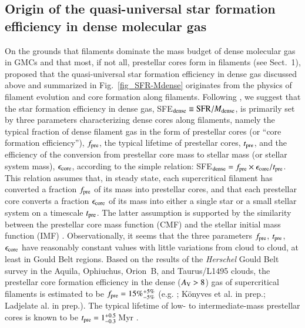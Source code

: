 \documentclass{aa}
\begin{document}
{{\subsection{Origin of the quasi-universal star formation efficiency in dense molecular gas}\label{Sect:origin}

On the grounds that filaments dominate the mass budget of dense molecular gas in GMCs and that most, if not all, prestellar cores form in filaments (see Sect.~1), 
\citet{Andre14} proposed that the quasi-universal star formation efficiency in dense gas discussed above and summarized in Fig.~\ref{fig_SFR-Mdense} 
originates from the physics of filament evolution and core formation along filaments.
Following \citet{Andre14}, we suggest that the star formation efficiency in dense gas, SFE$_{\rm dense} \equiv  {\rm SFR}/M_{\rm dense}$, 
is primarily set by three parameters characterizing dense cores along filaments, namely the typical fraction of dense filament gas in the form of prestellar cores
(or ``core formation efficiency''), 
$f_{\rm pre}$, 
the typical lifetime of prestellar cores, $t_{\rm pre}$, and the efficiency of the conversion from prestellar core mass to stellar mass (or stellar system mass), 
$\epsilon_{\rm core}$, according to the simple relation: SFE$_{\rm dense} = f_{\rm pre} \times \epsilon_{\rm core} / t_{\rm pre}$. 
This relation assumes that, in steady state, each supercritical filament 
has converted a fraction $f_{\rm pre}$ of its mass into prestellar cores, and that each prestellar core converts a fraction 
$\epsilon_{\rm core}$ of its mass into either a single star or a small stellar system on a timescale $t_{\rm pre}$. 
The latter assumption is supported by the similarity between the prestellar core mass function (CMF) and the stellar initial mass function (IMF) \cite[e.g.][]{Motte98, Enoch08,Andre10}.
Observationally, it seems that 
the three parameters $f_{\rm pre}$, $t_{\rm pre}$, $\epsilon_{\rm core}$ 
have reasonably constant values with little variations from cloud to cloud, at least in Gould Belt regions. 
Based on the results of the {\it Herschel} Gould Belt survey in the Aquila, Ophiuchus, Orion~B, and Taurus/L1495 clouds, the prestellar core formation efficiency 
in the dense ($A_{\rm V} > 8$) 
gas of supercritical filaments is estimated to be 
{$f_{\rm pre} = 15\%^{+5\%}_{-5\%}$} (e.g. \citealp{Konyves15}; K\"onyves et al.  in prep.; Ladjelate al. in prep.).
The typical lifetime of low- to intermediate-mass prestellar cores is known to be $t_{\rm pre} = 1^{+0.5}_{-0.3}\, $Myr \citep[e.g.][]{Lee99, Jessop00, Konyves15}. 
}}
\end{document}
